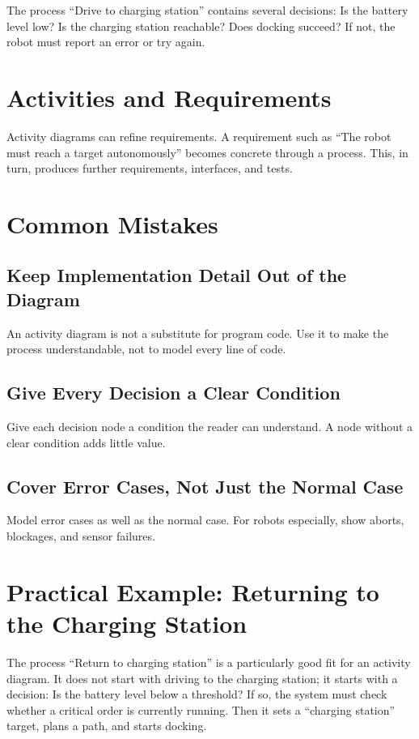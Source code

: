 \begin{praxisbox}
The process \enquote{Drive to charging station} contains several decisions: Is the battery level low? Is the charging station reachable? Does docking succeed? If not, the robot must report an error or try again.
\end{praxisbox}

\section{Activities and Requirements}
Activity diagrams can refine requirements. A requirement such as \enquote{The robot must reach a target autonomously} becomes concrete through a process. This, in turn, produces further requirements, interfaces, and tests.

\section{Common Mistakes}
\subsection{Keep Implementation Detail Out of the Diagram}
An activity diagram is not a substitute for program code. Use it to make the process understandable, not to model every line of code.

\subsection{Give Every Decision a Clear Condition}
Give each decision node a condition the reader can understand. A node without a clear condition adds little value.

\subsection{Cover Error Cases, Not Just the Normal Case}
Model error cases as well as the normal case. For robots especially, show aborts, blockages, and sensor failures.

\section{Practical Example: Returning to the Charging Station}
The process \enquote{Return to charging station} is a particularly good fit for an activity diagram. It does not start with driving to the charging station; it starts with a decision: Is the battery level below a threshold? If so, the system must check whether a critical order is currently running. Then it sets a \enquote{charging station} target, plans a path, and starts docking.

